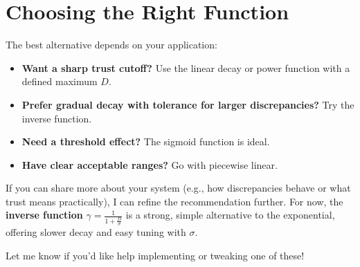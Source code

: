 \documentclass{article}
\begin{document}
\section*{Choosing the Right Function}
The best alternative depends on your application:
\begin{itemize}
    \item \textbf{Want a sharp trust cutoff?} Use the linear decay or power function with a defined maximum \(D\).
    \item \textbf{Prefer gradual decay with tolerance for larger discrepancies?} Try the inverse function.
    \item \textbf{Need a threshold effect?} The sigmoid function is ideal.
    \item \textbf{Have clear acceptable ranges?} Go with piecewise linear.
\end{itemize}

If you can share more about your system (e.g., how discrepancies behave or what trust means practically), I can refine the recommendation further. For now, the \textbf{inverse function} \(\gamma = \frac{1}{1 + \frac{D}{\sigma}}\) is a strong, simple alternative to the exponential, offering slower decay and easy tuning with \(\sigma\).

Let me know if you'd like help implementing or tweaking one of these!
\end{document}
